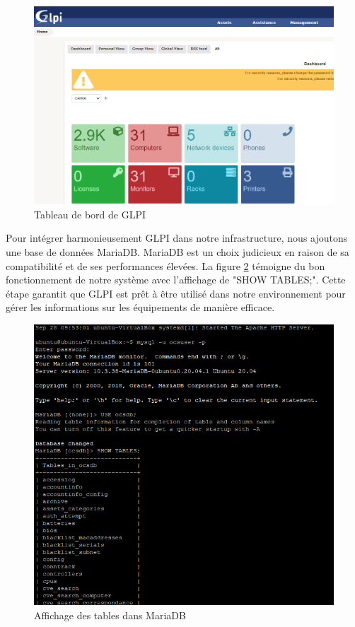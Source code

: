 \begin{figure}[H]
\centering
\includegraphics[width=15cm]{Images/GLPI.png}
\caption{Tableau de bord de GLPI}
\label{fig:glpi-dashboard}
\end{figure}

Pour intégrer harmonieusement GLPI dans notre infrastructure, nous ajoutons une base de données MariaDB. MariaDB est un choix judicieux en raison de sa compatibilité et de ses performances élevées. La figure \ref{fig:Putty-MARIADB-SHOWTABLES} témoigne du bon fonctionnement de notre système avec l'affichage de "SHOW TABLES;". Cette étape garantit que GLPI est prêt à être utilisé dans notre environnement pour gérer les informations sur les équipements de manière efficace.


\begin{figure}[H]
\centering
\includegraphics[width=15cm]{Images/20230928102651.png}
\caption{Affichage des tables dans MariaDB}
\label{fig:Putty-MARIADB-SHOWTABLES}
\end{figure}


